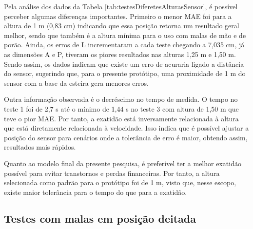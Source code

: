 \begin{table}[h!]
\centering
{}
\caption{exatidão do protótipo para alturas diferentes do sensor}
\label{tab:testesDiferetesAlturasSensor}
\end{table}

    Pela análise dos dados da Tabela \ref{tab:testesDiferetesAlturasSensor}, é possível perceber algumas diferenças importantes. Primeiro o menor MAE foi para a altura de 1 m (0,83 cm) indicando que essa posição retorna um resultado geral melhor, sendo que também é a altura mínima para o uso com malas de mão e de porão. Ainda, os erros de L incrementaram a cada teste chegando a 7,035 cm, já as dimensões A e P, tiveram os piores resultados nas alturas 1,25 m e 1,50 m. Sendo assim, os dados indicam que existe um erro de acuraria ligado a distância do sensor, sugerindo que, para o presente protótipo, uma proximidade de 1 m do sensor com a base da esteira gera menores erros.
    
    Outra informação observada é o decréscimo no tempo de medida. O tempo no teste 1 foi de 2,7 s até o mínimo de 1,44 s no teste 3 com altura de 1,50 m que teve o pior MAE. Por tanto, a exatidão está inversamente relacionada à altura que está diretamente relacionada à velocidade. Isso indica que é possível ajustar a posição do sensor para cenários onde a tolerância de erro é maior, obtendo assim, resultados mais rápidos.
    
    Quanto ao modelo final da presente pesquisa, é preferível ter a melhor exatidão possível para evitar transtornos e perdas financeiras. Por tanto, a altura selecionada como padrão para o protótipo foi de 1 m, visto que, nesse escopo, existe maior tolerância para o tempo do que para a exatidão.



\subsection{Testes com malas em posição deitada}
\label{sec_Testes com mala em posicao deitada}

